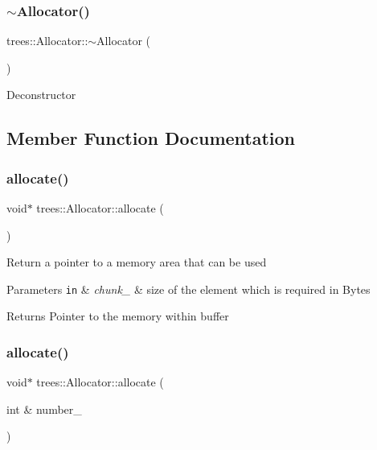 \subsubsection{\texorpdfstring{$\sim$\+Allocator()}{~Allocator()}}
{\footnotesize\ttfamily trees\+::\+Allocator\+::$\sim$\+Allocator (\begin{DoxyParamCaption}{ }\end{DoxyParamCaption})\hspace{0.3cm}{\ttfamily [inline]}}

Deconstructor 

\subsection{Member Function Documentation}
\mbox{\label{classtrees_1_1_allocator_aa35a3d63a9a05ce16f01fcd290973990}} 
\subsubsection{\texorpdfstring{allocate()}{allocate()}\hspace{0.1cm}{\footnotesize\ttfamily [1/2]}}
{\footnotesize\ttfamily void$\ast$ trees\+::\+Allocator\+::allocate (\begin{DoxyParamCaption}{ }\end{DoxyParamCaption})\hspace{0.3cm}{\ttfamily [inline]}}

Return a pointer to a memory area that can be used


\begin{DoxyParams}[1]{Parameters}
\mbox{\tt in}  & {\em chunk\+\_\+} & size of the element which is required in Bytes \\
\hline
\end{DoxyParams}
\begin{DoxyReturn}{Returns}
Pointer to the memory within buffer 
\end{DoxyReturn}
\mbox{\label{classtrees_1_1_allocator_a03c0be0196af451bfd8c48dbe6fdb1f1}} 
\subsubsection{\texorpdfstring{allocate()}{allocate()}\hspace{0.1cm}{\footnotesize\ttfamily [2/2]}}
{\footnotesize\ttfamily void$\ast$ trees\+::\+Allocator\+::allocate (\begin{DoxyParamCaption}\item[{int \&}]{number\+\_\+ }\end{DoxyParamCaption})\hspace{0.3cm}{\ttfamily [inline]}}

